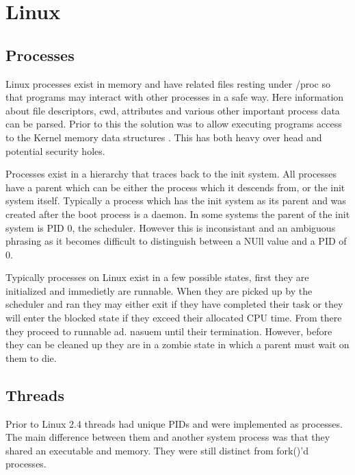 \documentclass[letterpaper,10pt,notitlepage,fleqn]{article}
\begin{document}
\section{Linux}



\subsection{Processes}

Linux processes exist in memory and have related files resting under /proc so that programs
may interact with other processes in a safe way. Here information about file descriptors, cwd,
attributes and various other important process data can be parsed. Prior to this the solution 
was to allow executing programs access to the Kernel memory data structures \cite{FHS}. 
This has both heavy over head and potential security holes. 


Processes exist in a hierarchy that traces back to the init system. All processes have
a parent which can be either the process which it descends from, or the init system itself.
Typically a process which has the init system as its parent and was created after the boot process
is a daemon\cite{LinuxBook}. In some systems the parent of the init system is PID 0, the 
scheduler. However this is inconsistant and an ambiguous phrasing as it becomes difficult to
distinguish between a NUll value and a PID of 0. 

Typically processes on Linux exist in a few possible states, first they are initialized and 
immedietly are runnable. When they are picked up by the scheduler and ran they may either exit
if they have completed their task or they will enter the blocked state if they exceed their 
allocated CPU time. From there they proceed to runnable ad. nasuem until their termination.
However, before they can be cleaned up they are in a zombie state in which a parent must 
wait on them to die. \cite{McGrath} 


\subsection{Threads}


Prior to Linux 2.4 threads had unique PIDs and were implemented as processes. The main difference 
between them and another system process was that they shared an executable and memory. They were 
still distinct from fork()'d processes. 
\end{document}
